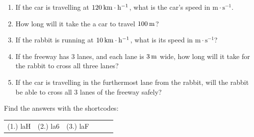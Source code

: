 \begin{enumerate}[noitemsep, label=\textbf{\arabic*}. ]
\begin{figure}[H]
\begin{center}
      \vspace{2pt}
    \vspace{.1in}
    
    \end{center}

 \end{figure}   

    \addtocounter{footnote}{-0}
    
\label{m38791*id67018}\begin{enumerate}[noitemsep, label=\textbf{\alph*}. ] 
            \label{m38791*uid52}\item If the car is travelling at \begin{math}120\phantom{\rule{2pt}{0ex}}\mathrm{km}\ensuremath{\cdot}\mathrm{h}{}^{-1}\end{math}, what is the car's speed in \begin{math}\mathrm{m}\ensuremath{\cdot}\mathrm{s}{}^{-1}\end{math}.
\label{m38791*uid53}\item How long will it take the a car to travel \begin{math}100\phantom{\rule{2pt}{0ex}}\mathrm{m}\end{math}?
\label{m38791*uid54}\item If the rabbit is running at \begin{math}10\phantom{\rule{2pt}{0ex}}\mathrm{km}\ensuremath{\cdot}\mathrm{h}{}^{-1}\end{math}, what is its speed in \begin{math}\mathrm{m}\ensuremath{\cdot}\mathrm{s}{}^{-1}\end{math}?
\label{m38791*uid55}\item If the freeway has 3 lanes, and each lane is \begin{math}3\phantom{\rule{2pt}{0ex}}\mathrm{m}\end{math} wide, how long will it take for the rabbit to cross all three lanes?
\label{m38791*uid56}\item If the car is travelling in the furthermost lane from the rabbit, will the rabbit be able to cross all 3 lanes of the freeway safely?
\end{enumerate}
                \end{enumerate}
        
        
        

\label{m38791*secfhsst!!!underscore!!!id1289}
\par {} Find the answers with the shortcodes:
 \par \begin{tabular}[h]{cccccc}
 (1.) laH  &  (2.) la6  &  (3.) laF  & \end{tabular}




